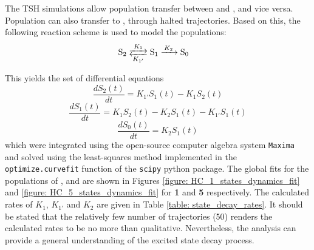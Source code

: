 The \ac{TSH} simulations allow population transfer between \stwo{} and \sone{}, and vice versa. Population can also transfer to \szero{}, through halted trajectories. Based on this, the following reaction scheme is used to model the populations:
\begin{align*}
\centering
\ce{&S_{2} <-->[{$K_{1}$}][{$K_{1'}$}] S_{1} ->[$K_{2}$] S_{0}}
\end{align*}

This yields the set of differential equations
\begin{equation}\label{equation: s2rate}
    \frac{dS_{2}(t)}{dt}=K_{1'}S_{1}(t)-K_{1}S_{2}(t)
\end{equation}
\begin{equation}\label{equation: s1rate}
    \frac{dS_{1}(t)}{dt}=K_{1}S_{2}(t)-K_{2}S_{1}(t)-K_{1'}S_{1}(t)
\end{equation}
\begin{equation}\label{equation: s0rate}
    \frac{dS_{0}(t)}{dt}=K_{2}S_{1}(t)
\end{equation}
which were integrated using the open-source computer algebra system \texttt{Maxima} and solved using the least-squares method implemented in the \texttt{optimize.curve\textunderscore{}fit} function of the \texttt{scipy} python package.\cite{maxima,scipy} The global fits for the populations of \stwo{}, \sone{} and \szero{} are shown in Figures \ref{figure: HC_1_states_dynamics_fit} and \ref{figure: HC_5_states_dynamics_fit} for \textbf{1} and \textbf{5} respectively. The calculated rates of $K_{1}$, $K_{1'}$ and $K_{2}$ are given in Table \ref{table: state_decay_rates}. It should be stated that the relatively few number of trajectories (50) renders the calculated rates to be no more than qualitative. Nevertheless, the analysis can provide a general understanding of the excited state decay process. 

